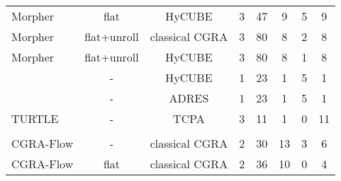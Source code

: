 \begin{table}
{\begin{tabular}{|l|c|c|c|c|c|c|c|}
 {Morpher}                                            & {flat}                               & HyCUBE                               & 3                              & 47                            & 9                          & 5                                   & 9 \\ 
 {Morpher}                                            & {flat+unroll}                        & classical CGRA                            & 3                              & 80                            & 8                          & 2                                   & 8 \\ 
 {Morpher}                                            & {flat+unroll}                        & HyCUBE                               & 3                              & 80                            & 8                          & 1                                   & 8 \\
 \rowcolor{darkOrange!50}{CGRA-ME}                    & {-}                                  & HyCUBE                               & 1                              & 23                            & 1                          & 5                                   & 1 \\
 \rowcolor{darkOrange!50}{Pillars}                    & {-}                                  & ADRES                                & 1                              & 23                            & 1                          & 5                                   & 1 \\
 {TURTLE}                                               & {-}                                  & TCPA                               & 3                              & 11                            & 1                          & 0                                   & 11 \\ \hline\hline
 \rowcolor{darkGray} \multicolumn{8}{|c|}{\color{white}{\textbf{ATAX}}} \\\hline
 {CGRA-Flow}                                          & -                                    & classical CGRA                            & 2                              & 30                            & 13                         & 3                                   & 6 \\ 
 {CGRA-Flow}                                          & flat                                 & classical CGRA                            & 2                              & 36                            & 10                         & 0                                   & 4 \\

\end{tabular}}
\end{table}
